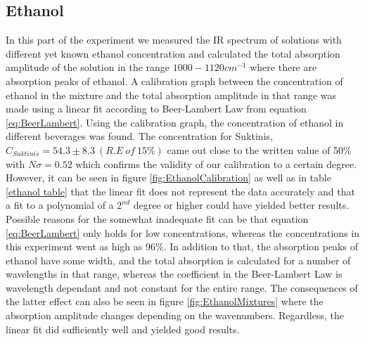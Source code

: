 \documentclass[reprint,amsmath,amssymb,aps, prl,superscriptaddress]{revtex4-2}
\begin{document}
\subsection{Ethanol}
In this part of the experiment we measured the IR spectrum of solutions with different yet 
known ethanol concentration
and calculated the total absorption amplitude of the solution in the range $1000-1120 cm^{-1}$ where there are absorption peaks of ethanol. A calibration graph between the concentration of ethanol in the mixture and the total absorption amplitude in that range was made using a linear fit according to Beer-Lambert Law from equation \ref{eq:BeerLambert}. 
Using the calibration graph, the concentration of ethanol in different beverages was found. The concentration for Suktinis, $C_{Suktinis}=54.3\pm8.3\ (R.E\ of\ 15\%)$ came out close to the written value of 50\% with $N{\sigma}=0.52$ \cite{Suktinis} which confirms the validity of our calibration to a certain degree. However, it can be seen in figure \ref{fig:EthanolCalibration}
as well as in table \ref{ethanol table}
that the linear fit does not represent the data accurately and that a fit to a polynomial of a $2^{nd}$ degree or higher could have yielded better results. Possible reasons for the somewhat inadequate fit can be that equation \ref{eq:BeerLambert} only holds for low concentrations, whereas 
the concentrations
in this experiment went as high as 96\%. In addition to that, the absorption peaks of ethanol
have some width, and the total
absorption is calculated
for a number of wavelengths in that range, whereas the coefficient in the
Beer-Lambert Law is wavelength dependant and not constant for the entire range.
The consequences of the latter effect can also be seen in figure \ref{fig:EthanolMixtures} where the absorption amplitude changes depending on the wavenumbers.
Regardless, the linear fit did sufficiently well and yielded good results.
\end{document}
